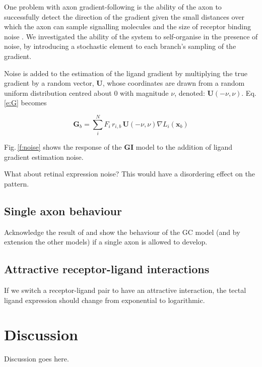 \documentclass[11pt, a4paper, draft]{article}
\begin{document}
One problem with axon gradient-following is the ability of the axon to
successfully detect the direction of the gradient given the small distances
over which the axon can sample signalling molecules and the size of receptor
binding noise \citep{goodhill_noise_2014}.  We investigated the ability of the
system to self-organise in the presence of noise, by introducing a stochastic
element to each branch's sampling of the gradient.

Noise is added to the estimation of the ligand gradient by multiplying the
true gradient by a random vector, $\mathbf{U}$, whose coordinates are drawn
from a random uniform distribution centred about 0 with magnitude $\nu$, denoted:
$\mathbf{U}(-\nu, \nu)$. Eq.\,\ref{e:G} becomes

\begin{equation}\label{e:Gnu}
\mathbf{G}_b = \sum_i^N F_i\,r_{i,b}\, \mathbf{U}(-\nu, \nu) \nabla L_i(\mathbf{x}_b)
\end{equation}

Fig.\,\ref{f:noise} shows the response of the $\mathbf{GI}$ model to the
addition of ligand gradient estimation noise.

What about retinal expression noise? This would have a disordering effect on
the pattern.

\subsection*{Single axon behaviour}

Acknowledge the result of \citet{gosse_retinotopic_2008} and show the
behaviour of the GC model (and by extension the other models) if a single axon
is allowed to develop.

\subsection*{Attractive receptor-ligand interactions}

If we switch a receptor-ligand pair to have an attractive interaction, the
tectal ligand expression should change from exponential to logarithmic.

\section{Discussion}
Discussion goes here.


\end{document}

